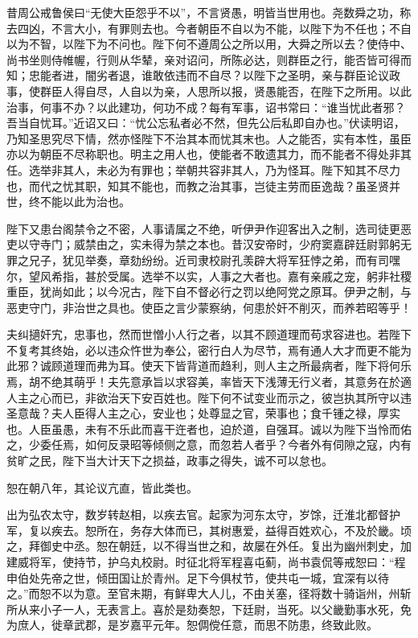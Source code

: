 \documentclass[12pt,UTF8]{ctexbook}
\begin{document}
昔周公戒鲁侯曰“无使大臣怨乎不以”，不言贤愚，明皆当世用也。尧数舜之功，称去四凶，不言大小，有罪则去也。今者朝臣不自以为不能，以陛下为不任也；不自以为不智，以陛下为不问也。陛下何不遵周公之所以用，大舜之所以去？使侍中、尚书坐则侍帷幄，行则从华辇，亲对诏问，所陈必达，则群臣之行，能否皆可得而知；忠能者进，闇劣者退，谁敢依违而不自尽？以陛下之圣明，亲与群臣论议政事，使群臣人得自尽，人自以为亲，人思所以报，贤愚能否，在陛下之所用。以此治事，何事不办？以此建功，何功不成？每有军事，诏书常曰：“谁当忧此者邪？吾当自忧耳。”近诏又曰：“忧公忘私者必不然，但先公后私即自办也。”伏读明诏，乃知圣思究尽下情，然亦怪陛下不治其本而忧其末也。人之能否，实有本性，虽臣亦以为朝臣不尽称职也。明主之用人也，使能者不敢遗其力，而不能者不得处非其任。选举非其人，未必为有罪也；举朝共容非其人，乃为怪耳。陛下知其不尽力也，而代之忧其职，知其不能也，而教之治其事，岂徒主劳而臣逸哉？虽圣贤并世，终不能以此为治也。

陛下又患台阁禁令之不密，人事请属之不绝，听伊尹作迎客出入之制，选司徒更恶吏以守寺门；威禁由之，实未得为禁之本也。昔汉安帝时，少府窦嘉辟廷尉郭躬无罪之兄子，犹见举奏，章劾纷纷。近司隶校尉孔羡辟大将军狂悖之弟，而有司嘿尔，望风希指，甚於受属。选举不以实，人事之大者也。嘉有亲戚之宠，躬非社稷重臣，犹尚如此；以今况古，陛下自不督必行之罚以绝阿党之原耳。伊尹之制，与恶吏守门，非治世之具也。使臣之言少蒙察纳，何患於奸不削灭，而养若昭等乎！

夫纠擿奸宄，忠事也，然而世憎小人行之者，以其不顾道理而苟求容进也。若陛下不复考其终始，必以违众忤世为奉公，密行白人为尽节，焉有通人大才而更不能为此邪？诚顾道理而弗为耳。使天下皆背道而趋利，则人主之所最病者，陛下将何乐焉，胡不绝其萌乎！夫先意承旨以求容美，率皆天下浅薄无行义者，其意务在於適人主之心而已，非欲治天下安百姓也。陛下何不试变业而示之，彼岂执其所守以违圣意哉？夫人臣得人主之心，安业也；处尊显之官，荣事也；食千锺之禄，厚实也。人臣虽愚，未有不乐此而喜干迕者也，迫於道，自强耳。诚以为陛下当怜而佑之，少委任焉，如何反录昭等倾侧之意，而忽若人者乎？今者外有伺隙之寇，内有贫旷之民，陛下当大计天下之损益，政事之得失，诚不可以怠也。

恕在朝八年，其论议亢直，皆此类也。

出为弘农太守，数岁转赵相，以疾去官。起家为河东太守，岁馀，迁淮北都督护军，复以疾去。恕所在，务存大体而已，其树惠爱，益得百姓欢心，不及於畿。顷之，拜御史中丞。恕在朝廷，以不得当世之和，故屡在外任。复出为幽州刺史，加建威将军，使持节，护乌丸校尉。时征北将军程喜屯蓟，尚书袁侃等戒恕曰：“程申伯处先帝之世，倾田国让於青州。足下今俱杖节，使共屯一城，宜深有以待之。”而恕不以为意。至官未期，有鲜卑大人儿，不由关塞，径将数十骑诣州，州斩所从来小子一人，无表言上。喜於是劾奏恕，下廷尉，当死。以父畿勤事水死，免为庶人，徙章武郡，是岁嘉平元年。恕倜傥任意，而思不防患，终致此败。
\end{document}
